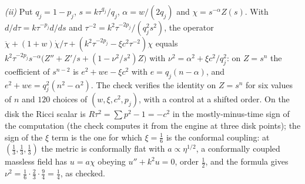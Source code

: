 \emph{(ii)} Put $q_{j} = 1 - p_{j}$, $s = k\tau^{q_{j}}/q_{j}$, $\alpha = w/(2q_{j})$ and $\chi = s^{-\alpha}Z(s)$. With $d/d\tau = k\tau^{-p_{j}}d/ds$ and $\tau^{-2} = k^{2}\tau^{-2p_{j}}/(q_{j}^{2}s^{2})$, the operator $\ddot\chi + (1 + w)\dot\chi/\tau + (k^{2}\tau^{-2p_{j}} - \xi c^{2}\tau^{-2})\chi$ equals $k^{2}\tau^{-2p_{j}}s^{-\alpha}\bigl(Z'' + Z'/s + (1 - \nu^{2}/s^{2})Z\bigr)$ with $\nu^{2} = \alpha^{2} + \xi c^{2}/q_{j}^{2}$: on $Z = s^{n}$ the coefficient of $s^{n - 2}$ is $e^{2} + we - \xi c^{2}$ with $e = q_{j}(n - \alpha)$, and $e^{2} + we = q_{j}^{2}(n^{2} - \alpha^{2})$. The check verifies the identity on $Z = s^{n}$ for six values of $n$ and $120$ choices of $(w, \xi, c^{2}, p_{j})$, with a control at a shifted order. On the disk the Ricci scalar is $R\tau^{2} = \sum p^{2} - 1 = -c^{2}$ in the mostly-minus-time sign of the computation (the check computes it from the engine at three disk points); the sign of the $\xi$ term is the one for which $\xi = \tfrac16$ is the conformal coupling: at $(\tfrac13, \tfrac13, \tfrac13)$ the metric is conformally flat with $a \propto \eta^{1/2}$, a conformally coupled massless field has $u = a\chi$ obeying $u'' + k^{2}u = 0$, order $\tfrac12$, and the formula gives $\nu^{2} = \tfrac16\cdot\tfrac23\cdot\tfrac94 = \tfrac14$, as checked.


